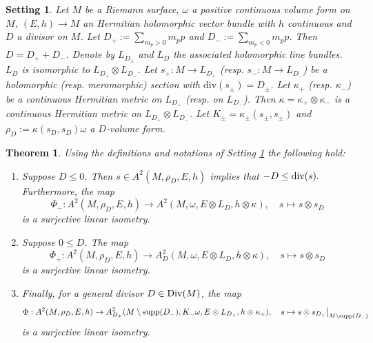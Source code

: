 \documentclass[10pt,a4paper]{amsart}
\newtheorem{setting}{Setting}
\newtheorem{theorem}{Theorem}
\begin{document}
\begin{setting}\label{S:input}
 Let $M$ be a Riemann surface, $\omega$ a positive continuous volume form on $M$,
 $(E,h)\rightarrow M$ an Hermitian holomorphic vector bundle with $h$ continuous and
 $D$ a divisor on $M$. Let
$D_+:=\sum_{m_p>0}m_pp$ and  
  $D_-:=\sum_{m_p<0}m_pp$.
    Then $D=D_++D_-$. Denote by  $L_{D_\pm}$ and  $L_D$ the associated holomorphic line bundles.  $L_D$
    is isomorphic to $L_{D_+}\otimes L_{D_-}$. Let $s_+:M\rightarrow L_{D_+}$ (resp. $s_-:M\rightarrow L_{D_-}$) be a holomorphic (resp. meromorphic) section with $\text{div}(s_\pm)=D_\pm$.
    Let $\kappa_+$ (resp. $\kappa_-$) be a continuous Hermitian  metric on $L_{D_+}$ (resp. on $L_{D_-}$).
    Then $\kappa=\kappa_+\otimes \kappa_-$ is a continuous Hermitian metric on $L_{D_+}\otimes L_{D_-}$.
     Let $K_\pm=\kappa_\pm(s_\pm,s_\pm)$ and
     $\rho_D:=\kappa(s_D,s_D)\omega$  a $D$-volume form.  
\end{setting}

\begin{theorem}\label{thm:Phiisom}
Using the definitions and notations of Setting \ref{S:input} the following hold:
 
 \begin{enumerate}
     \item 
  Suppose  $D\le0$. Then $s\in A^2(M,\rho_D,E,h)$ implies that $ 
 -D\le \text{\normalfont div}(s).$ Furthermore, the map
 $$
 \Phi_-:A^2(M,\rho_D,E,h)
 \rightarrow A^2(M,\omega,E\otimes L_D, h\otimes\kappa),\quad s\mapsto s\otimes s_D
 $$
 is a surjective linear isometry.

\item Suppose  $0\le D$. The 
 map
$$\Phi_+:A^2(M,\rho_D,E,h)
 \rightarrow A^2_D(M,\omega,E\otimes L_D, h\otimes\kappa),\quad s\mapsto s\otimes s_D
 $$
 is a surjective linear isometry.
 \item Finally, for a general divisor $D \in \text{\normalfont Div}(M)$, the map $$\Phi : A^2(M,\rho_D,E,h) \to A^2_{D_+}(M \setminus \text{\normalfont supp}(D_-), K_-\omega, E\otimes L_{D_+}, h \otimes \kappa_+ ), \quad s \mapsto s\otimes s_{D_+}\big|_{M \setminus \text{\normalfont supp}(D_-)}$$ is a surjective linear isometry.
 
 \end{enumerate}
\end{theorem}
\end{document}
